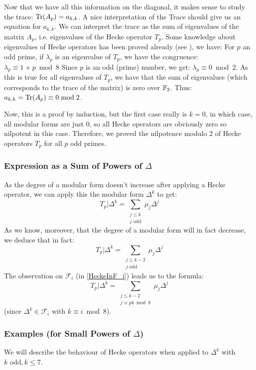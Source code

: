 Now that we have all this information on the diagonal, it makes sense to study the trace: 
$\text{Tr}(A_p) = a_{k,k}$.
A nice interpretation of the Trace should give us an equation for $a_{k,k}$.
We can interpret the trace as the sum of eigenvalues of the matrix $A_p$, i.e. eigenvalues of the Hecke operator $T_p$.
Some knowledge about eigenvalues of Hecke operators has been proved already (see \cite{EigenvaluesOfHeckeOperators}), we have:
For $p$ an odd prime, if $\lambda_p$ is an eigenvalue of $T_p$, we have the congruence: $\lambda_p \equiv 1+p \bmod 8$
Since $p$ is an odd (prime) number, we get: $\lambda_p \equiv 0 \bmod 2$.
As this is true for all eigenvalues of $T_p$, we have that the sum of eigenvalues (which corresponds to the trace of the matrix) is zero over $\mathbb{F}_2$.
Thus: 
$a_{k,k} = \text{Tr}(A_p) \equiv 0 \bmod 2$.

Now, this is a proof by induction, but the first case really is $k=0$, in which case, all modular forms are just $0$, so all Hecke operators are obviously zero so nilpotent in this case.
Therefore, we proved the nilpotence modulo 2 of Hecke operators $T_p$ for all $p$ odd primes.

\subsubsection[Expression for $T_p|\Delta^k$]{Expression as a Sum of Powers of $\Delta$}
As the degree of a modular form doesn't increase after applying a Hecke operator, we can apply this the modular form $\Delta^k$ to get:
$$
T_p|\Delta^k = \sum_{\substack{j \leq k \\ j \text{ odd}}} \mu_j\Delta^j
$$
As we know, moreover, that the degree of a modular form will in fact decrease, we deduce that in fact:
\[
T_p|\Delta^k = \sum_{\substack{j \leq k-2\\ j \text{ odd}}} \mu_j\Delta^j
\label{eq:TpDelta^k} \tag{*}
\]
The observation on $\mathcal{F}_i$ (in \ref{HeckeInF_i}) leads us to the formula:
\[
T_p|\Delta^k = \sum_{\substack{j \leq k-2\\ j \equiv pk \bmod 8}} \mu_j\Delta^j
\label{eq:TpDelta^k_bis} \tag{**}
\]
(since $\Delta^k \in \mathcal{F}_i \text{ with } k \equiv i \bmod 8$).

\subsubsection{Examples (for Small Powers of $\Delta$)}
We will describe the behaviour of Hecke operators when applied to $\Delta^k$ with $k \text{ odd}, k \leq 7$.

